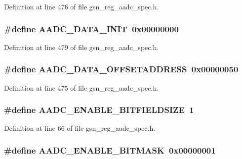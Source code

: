 Definition at line 476 of file gsn\_\-reg\_\-aadc\_\-spec.h.

\hypertarget{a00543_abf2829aaf0d69c9d84059d73e5db9150}{
\subsubsection[{AADC\_\-DATA\_\-INIT}]{\setlength{\rightskip}{0pt plus 5cm}\#define AADC\_\-DATA\_\-INIT~0x00000000}}
\label{a00543_abf2829aaf0d69c9d84059d73e5db9150}


Definition at line 479 of file gsn\_\-reg\_\-aadc\_\-spec.h.

\hypertarget{a00543_aa271f1ad94e358cb32da98eef3821e78}{
\subsubsection[{AADC\_\-DATA\_\-OFFSETADDRESS}]{\setlength{\rightskip}{0pt plus 5cm}\#define AADC\_\-DATA\_\-OFFSETADDRESS~0x00000050}}
\label{a00543_aa271f1ad94e358cb32da98eef3821e78}


Definition at line 475 of file gsn\_\-reg\_\-aadc\_\-spec.h.

\hypertarget{a00543_a27f8f2604f9c6feb5c249f24333cb2bf}{
\subsubsection[{AADC\_\-ENABLE\_\-BITFIELDSIZE}]{\setlength{\rightskip}{0pt plus 5cm}\#define AADC\_\-ENABLE\_\-BITFIELDSIZE~1}}
\label{a00543_a27f8f2604f9c6feb5c249f24333cb2bf}


Definition at line 66 of file gsn\_\-reg\_\-aadc\_\-spec.h.

\hypertarget{a00543_a6f546cf40b51f99e6428841ff85eaebd}{
\subsubsection[{AADC\_\-ENABLE\_\-BITMASK}]{\setlength{\rightskip}{0pt plus 5cm}\#define AADC\_\-ENABLE\_\-BITMASK~0x00000001}}
\label{a00543_a6f546cf40b51f99e6428841ff85eaebd}


